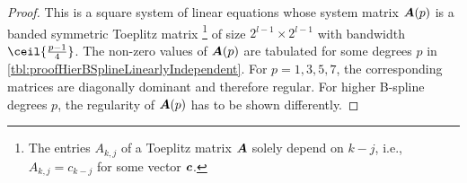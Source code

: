 \begin{proof}
  This is a square system of linear equations
  whose system matrix
  ${\boldsymbol{A}}(p)$ is a banded symmetric Toeplitz matrix%
  \footnote{%
    The entries $A_{k,j}$ of a Toeplitz matrix ${\boldsymbol{A}}$
    solely depend on $k - j$, i.e.,
    $A_{k,j} = c_{k-j}$ for some vector ${\boldsymbol{c}}$.%
  }
  of size
  $2^{l-1} \times 2^{l-1}$ with bandwidth $\ceil{\tfrac{p-1}{4}}$.
  The non-zero values of ${\boldsymbol{A}}(p)$ are tabulated for some degrees $p$
  in \cref{tbl:proofHierBSplineLinearlyIndependent}.
  For $p = 1, 3, 5, 7$,
  the corresponding matrices are diagonally dominant and therefore regular.
  For higher B-spline degrees $p$, the regularity of ${\boldsymbol{A}}(p)$ has
  to be shown differently.
  

\end{proof}
